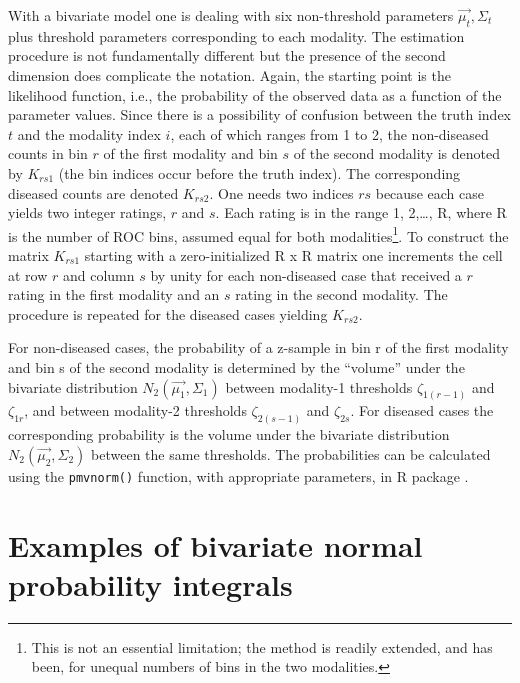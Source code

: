 \documentclass[
]{book}
\begin{document}
With a bivariate model one is dealing with six non-threshold parameters \(\overrightarrow{\mu_t}, \Sigma_t\) plus threshold parameters corresponding to each modality. The estimation procedure is not fundamentally different but the presence of the second dimension does complicate the notation. Again, the starting point is the likelihood function, i.e., the probability of the observed data as a function of the parameter values. Since there is a possibility of confusion between the truth index \(t\) and the modality index \(i\), each of which ranges from 1 to 2, the non-diseased counts in bin \(r\) of the first modality and bin \(s\) of the second modality is denoted by \(K_{rs1}\) (the bin indices occur before the truth index). The corresponding diseased counts are denoted \(K_{rs2}\). One needs two indices \(rs\) because each case yields two integer ratings, \(r\) and \(s\). Each rating is in the range 1, 2,\ldots, R, where R is the number of ROC bins, assumed equal for both modalities\footnote{This is not an essential limitation; the method is readily extended, and has been, for unequal numbers of bins in the two modalities.}. To construct the matrix \(K_{rs1}\) starting with a zero-initialized R x R matrix one increments the cell at row \(r\) and column \(s\) by unity for each non-diseased case that received a \(r\) rating in the first modality and an \(s\) rating in the second modality. The procedure is repeated for the diseased cases yielding \(K_{rs2}\).

For non-diseased cases, the probability of a z-sample in bin r of the first modality and bin s of the second modality is determined by the ``volume'' under the bivariate distribution \(N_2(\overrightarrow {\mu_1}, \Sigma_1)\) between modality-1 thresholds \(\zeta_{1(r-1)}\) and \(\zeta_{1r}\), and between modality-2 thresholds \(\zeta_{2(s-1)}\) and \(\zeta_{2s}\). For diseased cases the corresponding probability is the volume under the bivariate distribution \(N_2(\overrightarrow {\mu_2}, \Sigma_2)\) between the same thresholds. The probabilities can be calculated using the \texttt{pmvnorm()} function, with appropriate parameters, in R package \citep{R-mvtnorm}.

\hypertarget{bivariate-binormal-model-multivariate-density-examples}{%
\section{Examples of bivariate normal probability integrals}\label{bivariate-binormal-model-multivariate-density-examples}}
\end{document}
